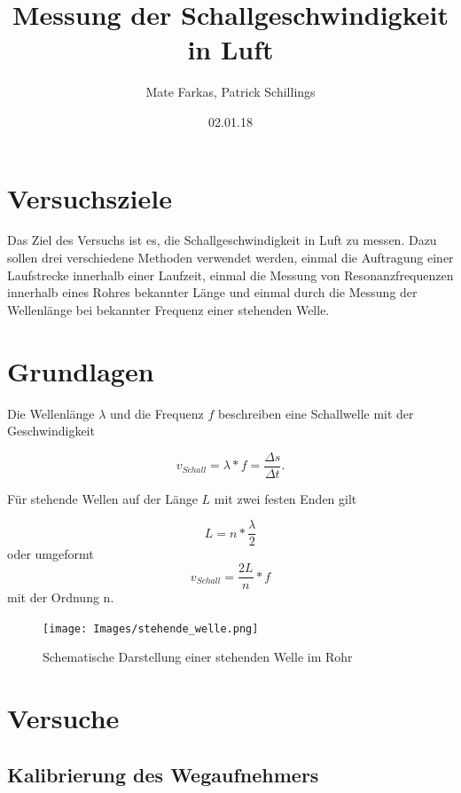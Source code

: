 \documentclass[]{article}
\title{Messung der Schallgeschwindigkeit in Luft}
\date{02.01.18}
\author{Mate Farkas, Patrick Schillings}
\begin{document}
	
	
	\tableofcontents
	
	\noindent\makebox[\linewidth]{\rule{\textwidth}{0.4pt}}
	
	\section{Versuchsziele}
	
	Das Ziel des Versuchs ist es, die Schallgeschwindigkeit in Luft zu messen. Dazu sollen drei verschiedene Methoden verwendet werden, einmal die Auftragung einer Laufstrecke innerhalb einer Laufzeit, einmal die Messung von Resonanzfrequenzen innerhalb eines Rohres bekannter Länge und einmal durch die Messung der Wellenlänge bei bekannter Frequenz einer stehenden Welle.
	
	\section{Grundlagen} %
	
	Die Wellenlänge $\lambda$ und die Frequenz $f$ beschreiben eine Schallwelle mit der Geschwindigkeit
	
	\begin{equation}
		v_{Schall}=\lambda*f=\frac{\Delta s}{\Delta t}.
		\label{e1}
	\end{equation}
	
	Für stehende Wellen auf der Länge $L$ mit zwei festen Enden gilt
	
	\begin{equation}
		L=n*\frac{\lambda}{2}
		\label{e2}
	\end{equation}
	oder umgeformt
	\begin{equation}
	v_{Schall}=\frac{2L}{n}*f
	\label{e3} 
	\end{equation}	
	mit der Ordnung n.
	
		\begin{figure}
		\begin{center}
			\texttt{[image: Images/stehende\_welle.png]}
			\caption{Schematische Darstellung einer stehenden Welle im Rohr}
			\label{welle_stehend}
		\end{center}
	\end{figure}
	
	\section{Versuche}
	
	\subsection{Kalibrierung des Wegaufnehmers}
\end{document}
